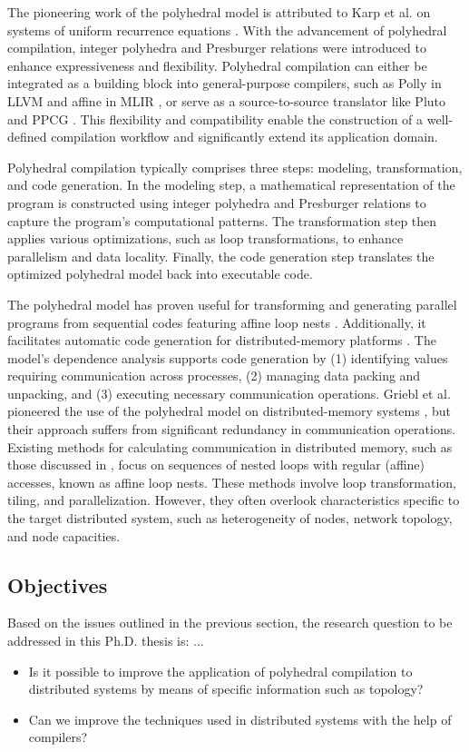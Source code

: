\documentclass[a4paper, 11pt]{article}
\begin{document}
The pioneering work of the polyhedral model is attributed to Karp et al. on systems of uniform recurrence equations \cite{}. With the advancement of polyhedral compilation, integer polyhedra \cite{} and Presburger relations \cite{} were introduced to enhance expressiveness and flexibility. Polyhedral compilation can either be integrated as a building block into general-purpose compilers, such as Polly in LLVM \cite{} and affine in MLIR \cite{}, or serve as a source-to-source translator like Pluto \cite{} and PPCG \cite{}. This flexibility and compatibility enable the construction of a well-defined compilation workflow and significantly extend its application domain.

Polyhedral compilation typically comprises three steps: modeling, transformation, and code generation. In the modeling step, a mathematical representation of the program is constructed using integer polyhedra and Presburger relations to capture the program's computational patterns. The transformation step then applies various optimizations, such as loop transformations, to enhance parallelism and data locality. Finally, the code generation step translates the optimized polyhedral model back into executable code.

The polyhedral model has proven useful for transforming and generating parallel programs from sequential codes featuring affine loop nests \cite{}. Additionally, it facilitates automatic code generation for distributed-memory platforms \cite{}. The model's dependence analysis supports code generation by (1) identifying values requiring communication across processes, (2) managing data packing and unpacking, and (3) executing necessary communication operations. Griebl et al. pioneered the use of the polyhedral model on distributed-memory systems \cite{}, but their approach suffers from significant redundancy in communication operations. Existing methods for calculating communication in distributed memory, such as those discussed in \cite{}, focus on sequences of nested loops with regular (affine) accesses, known as affine loop nests. These methods involve loop transformation, tiling, and parallelization. However, they often overlook characteristics specific to the target distributed system, such as heterogeneity of nodes, network topology, and node capacities.


\subsection{Objectives}
Based on the issues outlined in the previous section, the research question to be addressed in this Ph.D. thesis is: ...
\begin{itemize}
    \item Is it possible to improve the application of polyhedral compilation to distributed systems by means of specific information such as topology?
    \item Can we improve the techniques used in distributed systems with the help of compilers?
\end{itemize}
\end{document}
